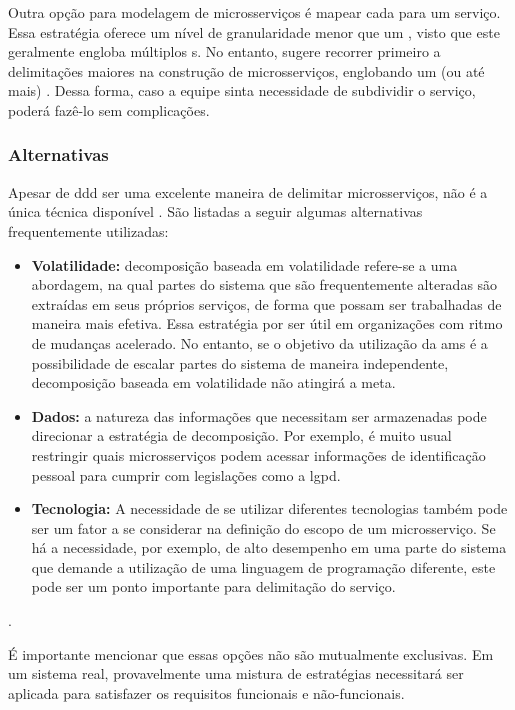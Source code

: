 Outra opção para modelagem de microsserviços é mapear cada  para um serviço. Essa estratégia oferece um nível de granularidade menor que um , visto que este geralmente engloba múltiplos s. No entanto,  sugere recorrer primeiro a delimitações maiores na construção de microsserviços, englobando um (ou até mais) . Dessa forma, caso a equipe sinta necessidade de subdividir o serviço, poderá fazê-lo sem complicações.

\subsubsection{Alternativas}
Apesar de \acrfull{ddd} ser uma excelente maneira de delimitar microsserviços, não é a única técnica disponível \cite{buildingMicroservices}. São listadas a seguir algumas alternativas frequentemente utilizadas:
\begin{itemize}
    \item \textbf{Volatilidade:} decomposição baseada em volatilidade refere-se a uma abordagem, na qual partes do sistema que são frequentemente alteradas são extraídas em seus próprios serviços, de forma que possam ser trabalhadas de maneira mais efetiva. Essa estratégia por ser útil em organizações com ritmo de mudanças acelerado. No entanto, se o objetivo da utilização da \acrshort{ams} é a possibilidade de escalar partes do sistema de maneira independente, decomposição baseada em volatilidade não atingirá a meta.
    \item \textbf{Dados:} a natureza das informações que necessitam ser armazenadas pode direcionar a estratégia de decomposição. Por exemplo, é muito usual restringir quais microsserviços podem acessar informações de identificação pessoal para cumprir com legislações como a \acrfull{lgpd}.
    \item \textbf{Tecnologia:} A necessidade de se utilizar diferentes tecnologias também pode ser um fator a se considerar na definição do escopo de um microsserviço. Se há a necessidade, por exemplo, de alto desempenho em uma parte do sistema que demande a utilização de uma linguagem de programação diferente, este pode ser um ponto importante para delimitação do serviço.
\end{itemize}
\cite{buildingMicroservices}.

É importante mencionar que essas opções não são mutualmente exclusivas. Em um sistema real, provavelmente uma mistura de estratégias necessitará ser aplicada para satisfazer os requisitos funcionais e não-funcionais.

